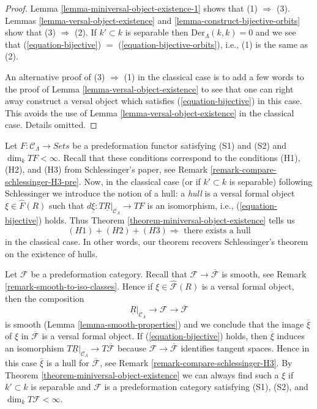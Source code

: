 \begin{proof}
Lemma \ref{lemma-miniversal-object-existence-1}
shows that (1) $\Rightarrow$ (3).
Lemmas \ref{lemma-versal-object-existence} and
\ref{lemma-construct-bijective-orbits}
show that (3) $\Rightarrow$ (2). If $k' \subset k$ is separable
then $\text{Der}_\Lambda(k, k) = 0$ and we see that
(\ref{equation-bijective}) $=$ (\ref{equation-bijective-orbits}), i.e.,
(1) is the same as (2).

\medskip\noindent
An alternative proof of (3) $\Rightarrow$ (1) in the classical case
is to add a few words to the proof of
Lemma \ref{lemma-versal-object-existence}
to see that one can right away construct a versal object which
satisfies (\ref{equation-bijective}) in this case. This avoids the use of
Lemma \ref{lemma-versal-object-existence}
in the classical case. Details omitted.
\end{proof}

\begin{remark}
\label{remark-compare-schlessinger-H3}
Let $F : \mathcal{C}_\Lambda \to \textit{Sets}$ be a predeformation functor
satisfying (S1) and (S2) and $\dim_k TF < \infty$.
Recall that these conditions correspond to the conditions
(H1), (H2), and (H3) from Schlessinger's paper, see
Remark \ref{remark-compare-schlessinger-H3-pre}.
Now, in the classical case (or if $k' \subset k$ is separable)
following Schlessinger we introduce the notion of a hull: a {\it hull}
is a versal formal object $\xi \in \widehat{F}(R)$ such that
$d\underline{\xi} : T\underline{R}|_{\mathcal{C}_\Lambda} \to TF$
is an isomorphism, i.e., (\ref{equation-bijective}) holds.
Thus Theorem \ref{theorem-miniversal-object-existence} tells us
$$
(H1) + (H2) + (H3)
\Rightarrow
\text{ there exists a hull}
$$
in the classical case. In other words, our theorem
recovers Schlessinger's theorem on the existence of hulls.
\end{remark}

\begin{remark}
\label{remark-compose-minimal-into-iso-classes}
Let $\mathcal{F}$ be a predeformation category. Recall that
$\mathcal{F} \to \overline{\mathcal{F}}$ is smooth, see
Remark \ref{remark-smooth-to-iso-classes}. Hence if
$\xi \in \widehat{\mathcal{F}}(R)$ is a versal formal object,
then the composition
$$
\underline{R}|_{\mathcal{C}_\Lambda} \longrightarrow
\mathcal{F} \longrightarrow \overline{\mathcal{F}}
$$
is smooth (Lemma \ref{lemma-smooth-properties}) and we conclude
that the image $\overline{\xi}$ of $\xi$ in
$\overline{\mathcal{F}}$ is a versal formal object.
If (\ref{equation-bijective}) holds, then $\overline{\xi}$
induces an isomorphism
$T\underline{R}|_{\mathcal{C}_\Lambda} \to T\overline{\mathcal{F}}$
because $\mathcal{F} \to \overline{\mathcal{F}}$ identifies tangent spaces.
Hence in this case $\overline{\xi}$
is a hull for $\overline{\mathcal{F}}$, see
Remark \ref{remark-compare-schlessinger-H3}.
By Theorem \ref{theorem-miniversal-object-existence}
we can always find such a $\xi$ if $k' \subset k$ is separable and
$\mathcal{F}$ is a predeformation category satisfying
(S1), (S2), and $\dim_k T\mathcal{F} < \infty$.
\end{remark}

